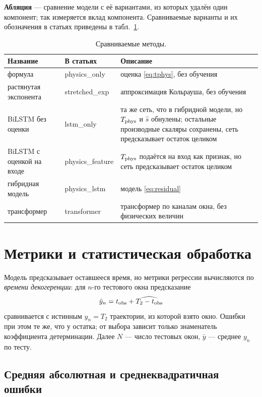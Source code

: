 \documentclass[12pt,a4paper]{report}
\numberwithin{equation}{chapter}
\begin{document}
\textbf{Абляция} --- сравнение модели с её вариантами, из которых удалён один
компонент; так измеряется вклад компонента. Сравниваемые варианты и их
обозначения в статьях приведены в табл.~\ref{tab:variants}.

\begin{table}[h]
\centering
\caption{Сравниваемые методы.}
\label{tab:variants}
\small
\begin{tabular}{@{}p{3.6cm}p{2.9cm}p{8.2cm}@{}}
\toprule
Название & В статьях & Описание \\
\midrule
формула & physics\_only & оценка \eqref{eq:tphys}, без обучения \\
растянутая экспонента & stretched\_exp & аппроксимация Кольрауша, без обучения \\
BiLSTM без оценки & lstm\_only & та же сеть, что в гибридной модели, но $T_{\rm phys}$
  и $\hat s$ обнулены; остальные производные скаляры сохранены, сеть
  предсказывает остаток целиком \\
BiLSTM с оценкой на входе & physics\_feature & $T_{\rm phys}$ подаётся на вход как
  признак, но сеть предсказывает остаток целиком \\
гибридная модель & physics\_lstm & модель \eqref{eq:residual} \\
трансформер & transformer & трансформер по каналам окна, без физических величин \\
\bottomrule
\end{tabular}
\end{table}

\chapter{Метрики и статистическая обработка}
\label{chap:metrics}

Модель предсказывает оставшееся время, но метрики регрессии вычисляются по
\emph{времени декогеренции}: для $n$-го тестового окна предсказание
\[
\hat y_n=t_{\rm obs}+\widehat{T_2-t_{\rm obs}}
\]
сравнивается с истинным
$y_n=T_2$ траектории, из которой взято окно. Ошибки при этом те же, что у
остатка; от выбора зависит только знаменатель коэффициента детерминации.
Далее $N$ --- число тестовых окон, $\bar y$ --- среднее $y_n$ по тесту.

\section{Средняя абсолютная и среднеквадратичная ошибки}
\end{document}
